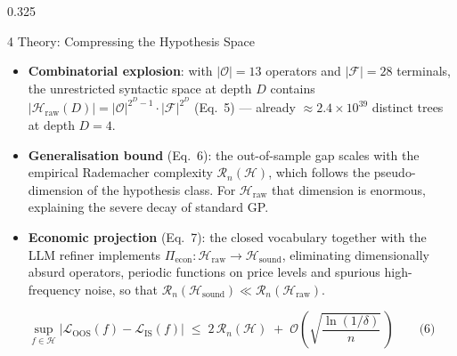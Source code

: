 \documentclass[final]{beamer}
\newcommand{\hl}[1]{\textbf{\color{navy2}#1}}
\begin{document}
\begin{frame}[t]{}
\begin{columns}[t]
\begin{column}{0.325\textwidth}
\begin{block}{4 \; Theory: Compressing the Hypothesis Space}
\begin{itemize}
  \item \hl{Combinatorial explosion}: with $|\mathcal{O}| = 13$ operators and $|\mathcal{F}| = 28$ terminals, the unrestricted syntactic space at depth $D$ contains
  $|\mathcal{H}_{\mathrm{raw}}(D)| = |\mathcal{O}|^{2^{D}-1}\cdot|\mathcal{F}|^{2^{D}}$
  (Eq.~5) --- already $\approx 2.4\times 10^{39}$ distinct trees at depth $D = 4$.
  \item \hl{Generalisation bound} (Eq.~6): the out-of-sample gap scales with the empirical Rademacher complexity $\mathcal{R}_n(\mathcal{H})$, which follows the pseudo-dimension of the hypothesis class. For $\mathcal{H}_{\mathrm{raw}}$ that dimension is enormous, explaining the severe decay of standard GP.
  \item \hl{Economic projection} (Eq.~7): the closed vocabulary together with the LLM refiner implements
  $\Pi_{\mathrm{econ}}:\mathcal{H}_{\mathrm{raw}} \to \mathcal{H}_{\mathrm{sound}}$, eliminating dimensionally absurd operators, periodic functions on price levels and spurious high-frequency noise, so that
  $\mathcal{R}_n(\mathcal{H}_{\mathrm{sound}}) \ll \mathcal{R}_n(\mathcal{H}_{\mathrm{raw}})$.
\end{itemize}
\vskip0.1cm
\[
\sup_{f\in\mathcal{H}}\bigl|\mathcal{L}_{\mathrm{OOS}}(f)-\mathcal{L}_{\mathrm{IS}}(f)\bigr| \;\leq\; 2\,\mathcal{R}_n(\mathcal{H}) \;+\; \mathcal{O}\!\left(\sqrt{\frac{\ln(1/\delta)}{n}}\,\right) \qquad \text{(6)}
\]
\end{block}


\end{column}
\end{columns}
\end{frame}
\end{document}
